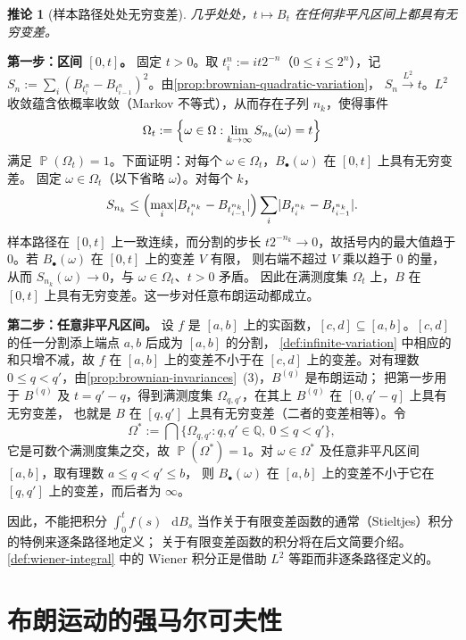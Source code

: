 \documentclass[UTF8,11pt,a4paper,oneside,fontset=fandol]{ctexrep}
\makeatletter
\numberwithin{equation}{section}
\theoremstyle{zhthm}
\newtheorem{corollary}[theorem]{推论}
\renewenvironment{proof}[1][\proofname]{\par
  \pushQED{\qed}%
  \normalfont\topsep6\p@\@plus6\p@\relax
  \trivlist
  \item[\hskip\labelsep\bfseries#1\hspace{0.5em}]\ignorespaces
}{%
  \popQED\endtrivlist\@endpefalse
}
\renewcommand{\proofname}{证明}
\newcommand{\Q}{\mathbb{Q}}
\DeclareMathOperator{\Prob}{\mathbb{P}}
\newcommand{\dd}{\mathop{}\!\mathrm{d}}
\DeclarePairedDelimiter{\abs}{\lvert}{\rvert}
\newcommand{\Lpto}[1]{\xrightarrow{L^{#1}}}
\makeatother
\begin{document}
\begin{corollary}[样本路径处处无穷变差]
\label{cor:brownian-infinite-variation}
几乎处处，$t\mapsto B_t$ 在任何非平凡区间上都具有无穷变差。
\end{corollary}

\begin{proof}
\textbf{\boldmath 第一步：区间 $[0,t]$。}
固定 $t>0$。取 $t_i^n:=it2^{-n}$（$0\le i\le2^n$），记 $S_n:=\sum_{i}(B_{t_i^n}-B_{t_{i-1}^n})^2$。由\cref{prop:brownian-quadratic-variation}，
$S_n\Lpto{2}t$。$L^2$ 收敛蕴含依概率收敛（Markov 不等式），从而存在子列 $n_k$，使得事件
\[
  \Omega_t:=\Bigl\{\omega\in\Omega:\lim_{k\to\infty}S_{n_k}(\omega)=t\Bigr\}
\]
满足 $\Prob(\Omega_t)=1$\cite[定理 2.3.2]{Durrett2019}。下面证明：对每个 $\omega\in\Omega_t$，$B_\bullet(\omega)$ 在 $[0,t]$ 上具有无穷变差。
固定 $\omega\in\Omega_t$（以下省略 $\omega$）。对每个 $k$，
\[
  S_{n_k}\le\Bigl(\max_{i}\abs{B_{t_i^{n_k}}-B_{t_{i-1}^{n_k}}}\Bigr)\sum_{i}\abs{B_{t_i^{n_k}}-B_{t_{i-1}^{n_k}}}.
\]
样本路径在 $[0,t]$ 上一致连续，而分割的步长 $t2^{-n_k}\to0$，故括号内的最大值趋于 $0$。若 $B_\bullet(\omega)$ 在 $[0,t]$ 上的变差 $V$ 有限，
则右端不超过 $V$ 乘以趋于 $0$ 的量，从而 $S_{n_k}(\omega)\to0$，与 $\omega\in\Omega_t$、$t>0$ 矛盾。
因此在满测度集 $\Omega_t$ 上，$B$ 在 $[0,t]$ 上具有无穷变差。这一步对任意布朗运动都成立。

\textbf{第二步：任意非平凡区间。}
设 $f$ 是 $[a,b]$ 上的实函数，$[c,d]\subseteq[a,b]$。$[c,d]$ 的任一分割添上端点 $a,b$ 后成为 $[a,b]$ 的分割，
\cref{def:infinite-variation} 中相应的和只增不减，故 $f$ 在 $[a,b]$ 上的变差不小于在 $[c,d]$ 上的变差。对有理数 $0\le q<q'$，由\cref{prop:brownian-invariances}~(3)，$B^{(q)}$ 是布朗运动；
把第一步用于 $B^{(q)}$ 及 $t=q'-q$，得到满测度集 $\Omega_{q,q'}$，在其上 $B^{(q)}$ 在 $[0,q'-q]$ 上具有无穷变差，
也就是 $B$ 在 $[q,q']$ 上具有无穷变差（二者的变差相等）。令
\[
  \Omega^*:=\bigcap\bigl\{\Omega_{q,q'}:q,q'\in\Q,\ 0\le q<q'\bigr\},
\]
它是可数个满测度集之交，故 $\Prob(\Omega^*)=1$。对 $\omega\in\Omega^*$ 及任意非平凡区间 $[a,b]$，取有理数 $a\le q<q'\le b$，
则 $B_\bullet(\omega)$ 在 $[a,b]$ 上的变差不小于它在 $[q,q']$ 上的变差，而后者为 $\infty$。
\end{proof}

因此，不能把积分 $\int_0^tf(s)\,\dd B_s$ 当作关于有限变差函数的通常（Stieltjes）积分的特例来逐条路径地定义；
关于有限变差函数的积分将在后文简要介绍。\cref{def:wiener-integral} 中的 Wiener 积分正是借助 $L^2$ 等距而非逐条路径定义的。

\section{布朗运动的强马尔可夫性}
\label{sec:strong-markov}
\end{document}
